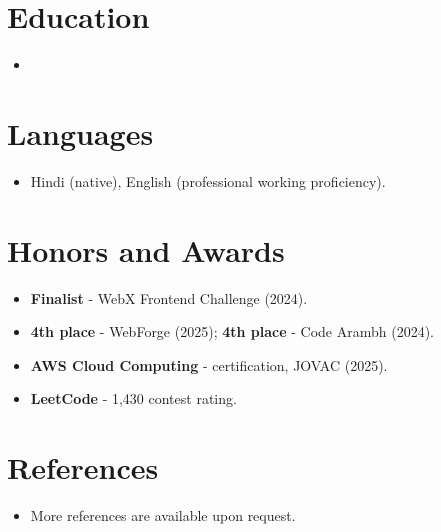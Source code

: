 \documentclass[11pt,a4paper,sans]{moderncv}
\begin{document}
\section{Education}
\vspace{1pt}
\begin{itemize}

\item{}

\end{itemize}


\section{Languages}
\vspace{1pt}
\begin{itemize}
\item {Hindi (native), English (professional working proficiency).}
\end{itemize}


\section{Honors and Awards}
\vspace{1pt}
\begin{itemize}
\item{\textbf{Finalist} - WebX Frontend Challenge (2024).}
\item{\textbf{4th place} - WebForge (2025); \textbf{4th place} - Code Arambh (2024).}
\item{\textbf{AWS Cloud Computing} - certification, JOVAC (2025).}
\item{\textbf{LeetCode} - 1,430 contest rating.}
\end{itemize}


\section{References}
\vspace{1pt}
\begin{itemize}
\item{More references are available upon request.}
\end{itemize}
\end{document}

